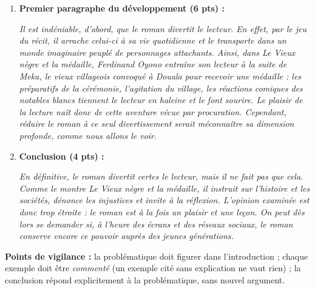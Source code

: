 \documentclass[11pt]{article}
\begin{document}
\begin{corrige}
\begin{enumerate}
\item \textbf{Premier paragraphe du développement (6 pts) :}

\emph{Il est indéniable, d'abord, que le roman divertit le lecteur. En effet, par le jeu du récit, il arrache celui-ci à sa vie quotidienne et le transporte dans un monde imaginaire peuplé de personnages attachants. Ainsi, dans \emph{Le Vieux nègre et la médaille}, Ferdinand Oyono entraîne son lecteur à la suite de Meka, le vieux villageois convoqué à Douala pour recevoir une médaille : les préparatifs de la cérémonie, l'agitation du village, les réactions comiques des notables blancs tiennent le lecteur en haleine et le font sourire. Le plaisir de la lecture naît donc de cette aventure vécue par procuration. Cependant, réduire le roman à ce seul divertissement serait méconnaître sa dimension profonde, comme nous allons le voir.}

\item \textbf{Conclusion (4 pts) :}

\emph{En définitive, le roman divertit certes le lecteur, mais il ne fait pas que cela. Comme le montre \emph{Le Vieux nègre et la médaille}, il instruit sur l'histoire et les sociétés, dénonce les injustices et invite à la réflexion. L'opinion examinée est donc trop étroite : le roman est à la fois un plaisir et une leçon. On peut dès lors se demander si, à l'heure des écrans et des réseaux sociaux, le roman conserve encore ce pouvoir auprès des jeunes générations.}
\end{enumerate}
\textbf{Points de vigilance :} la problématique doit figurer dans l'introduction ; chaque exemple doit être \emph{commenté} (un exemple cité sans explication ne vaut rien) ; la conclusion répond explicitement à la problématique, sans nouvel argument.
\end{corrige}
\end{document}
